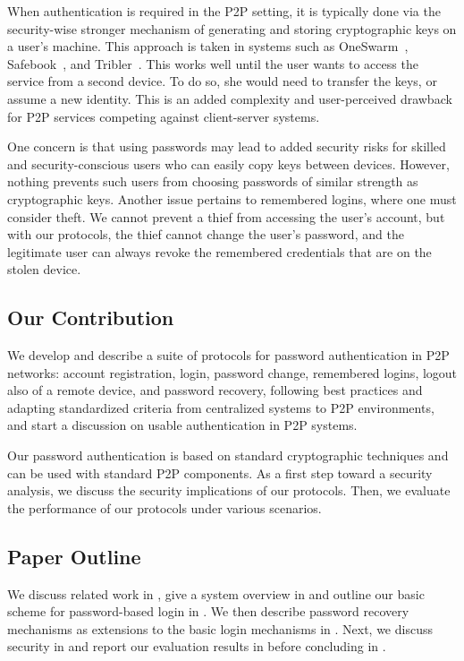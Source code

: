 When authentication is required in the P2P setting, it is typically done
via the security-wise stronger mechanism of generating and storing
cryptographic keys on a user's machine. This approach is taken in systems such
as OneSwarm~\cite{IsdalPKA10}, Safebook~\cite{Cutillo09a}, and
Tribler~\cite{AbbasPES09}.  This works well until the user wants to access the service from a second
device. To do so, she would need to transfer the keys, or assume a new
identity. This is an added complexity and user-perceived drawback for P2P
services competing against client-server systems.

One concern is that using passwords may lead to added security risks
for skilled and security-conscious users who can easily copy keys
between devices.  However, nothing prevents such users from choosing
passwords of similar strength as cryptographic keys. Another issue
pertains to remembered logins, where one must consider theft. We
cannot prevent a thief from accessing the user's account, but with our
protocols, the thief cannot change the user's password, and the
legitimate user can always revoke the remembered credentials that are
on the stolen device.

\subsection{Our Contribution}
We develop and describe a suite of protocols for password
authentication in P2P networks: account registration, login,
password change, remembered logins, logout also of a remote device, and password
recovery, following best practices and adapting standardized criteria
from centralized systems to P2P environments, and start a
discussion on usable authentication in P2P systems.

Our password authentication is based on standard
cryptographic techniques and can be used with standard P2P components. As a
first step toward a security analysis, we discuss the security implications of
our protocols. Then, we evaluate the performance of our protocols under various
scenarios.

\subsection{Paper Outline}
We discuss related work in , give a system
overview in  and outline our basic scheme for
password-based login in . We then describe
password recovery mechanisms as extensions to the basic login
mechanisms in . Next, we discuss security in
 and report our evaluation results in
 before concluding in .

